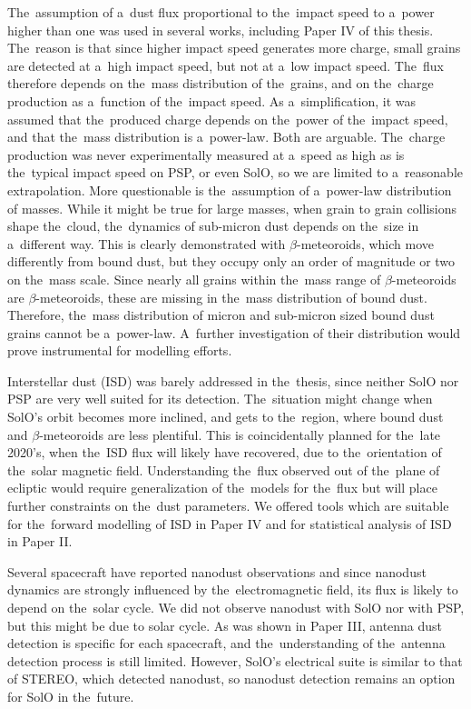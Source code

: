 The~assumption of a~dust flux proportional to the~impact speed to a~power higher than one was used in several works, including Paper IV of this thesis. The~reason is that since higher impact speed generates more charge, small grains are detected at a~high impact speed, but not at a~low impact speed. The~flux therefore depends on the~mass distribution of the~grains, and on the~charge production as a~function of the~impact speed. As a~simplification, it was assumed that the~produced charge depends on the~power of the~impact speed, and that the~mass distribution is a~power-law. Both are arguable. The~charge production was never experimentally measured at a~speed as high as is the~typical impact speed on PSP, or even SolO, so we are limited to a~reasonable extrapolation. More questionable is the~assumption of a~power-law distribution of masses. While it might be true for large masses, when grain to grain collisions shape the~cloud, the~dynamics of sub-micron dust depends on the~size in a~different way. This is clearly demonstrated with $\beta$-meteoroids, which move differently from bound dust, but they occupy only an order of magnitude or two on the~mass scale. Since nearly all grains within the~mass range of $\beta$-meteoroids are $\beta$-meteoroids, these are missing in the~mass distribution of bound dust. Therefore, the~mass distribution of micron and sub-micron sized bound dust grains cannot be a~power-law. A~further investigation of their distribution would prove instrumental for modelling efforts. 

Interstellar dust (ISD) was barely addressed in the~thesis, since neither SolO nor PSP are very well suited for its detection. The~situation might change when SolO's orbit becomes more inclined, and gets to the~region, where bound dust and $\beta$-meteoroids are less plentiful. This is coincidentally planned for the~late 2020's, when the~ISD flux will likely have recovered, due to the~orientation of the~solar magnetic field. Understanding the~flux observed out of the~plane of ecliptic would require generalization of the~models for the~flux but will place further constraints on the~dust parameters. We offered tools which are suitable for the~forward modelling of ISD in Paper IV and for statistical analysis of ISD in Paper II.

Several spacecraft have reported nanodust observations and since nanodust dynamics are strongly influenced by the~electromagnetic field, its flux is likely to depend on the~solar cycle. We did not observe nanodust with SolO nor with PSP, but this might be due to solar cycle. As was shown in Paper III, antenna dust detection is specific for each spacecraft, and the~understanding of the~antenna detection process is still limited. However, SolO's electrical suite is similar to that of STEREO, which detected nanodust, so nanodust detection remains an option for SolO in the~future.  

